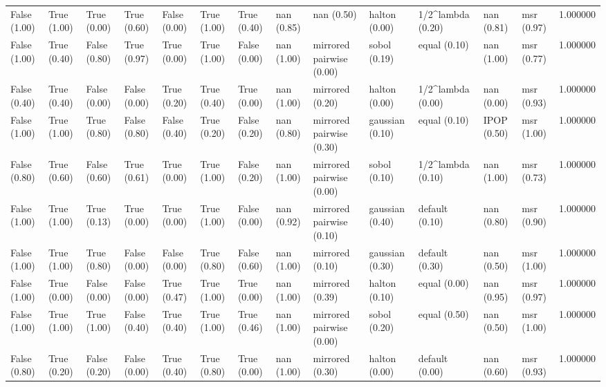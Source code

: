 \begin{tabular}{lllllllllllllr}
False (1.00) & True (1.00) & True (0.00) & True (0.60) & False (0.00) & True (1.00) & True (0.40) & nan (0.85) & nan (0.50) & halton (0.00) & 1/2^lambda (0.20) & nan (0.81) & msr (0.97) & 1.000000 \\
False (1.00) & True (0.40) & False (0.80) & True (0.97) & True (0.00) & True (1.00) & False (0.00) & nan (1.00) & mirrored pairwise (0.00) & sobol (0.19) & equal (0.10) & nan (1.00) & msr (0.77) & 1.000000 \\
False (0.40) & True (0.40) & False (0.00) & False (0.00) & True (0.20) & True (0.40) & True (0.00) & nan (1.00) & mirrored (0.20) & halton (0.00) & 1/2^lambda (0.00) & nan (0.00) & msr (0.93) & 1.000000 \\
False (1.00) & True (1.00) & True (0.80) & False (0.80) & False (0.40) & True (0.20) & False (0.20) & nan (0.80) & mirrored pairwise (0.30) & gaussian (0.10) & equal (0.10) & IPOP (0.50) & msr (1.00) & 1.000000 \\
False (0.80) & True (0.60) & False (0.60) & True (0.61) & True (0.00) & True (1.00) & False (0.20) & nan (1.00) & mirrored pairwise (0.00) & sobol (0.10) & 1/2^lambda (0.10) & nan (1.00) & msr (0.73) & 1.000000 \\
False (1.00) & True (1.00) & True (0.13) & True (0.00) & True (0.00) & True (1.00) & False (0.00) & nan (0.92) & mirrored pairwise (0.10) & gaussian (0.40) & default (0.10) & nan (0.80) & msr (0.90) & 1.000000 \\
False (1.00) & True (1.00) & True (0.80) & False (0.00) & False (0.00) & True (0.80) & False (0.60) & nan (1.00) & mirrored (0.10) & gaussian (0.30) & default (0.30) & nan (0.50) & msr (1.00) & 1.000000 \\
False (1.00) & True (0.00) & False (0.00) & False (0.00) & True (0.47) & True (1.00) & True (0.00) & nan (1.00) & mirrored (0.39) & halton (0.10) & equal (0.00) & nan (0.95) & msr (0.97) & 1.000000 \\
False (1.00) & True (1.00) & True (1.00) & False (0.40) & True (0.40) & True (1.00) & True (0.46) & nan (1.00) & mirrored pairwise (0.00) & sobol (0.20) & equal (0.50) & nan (0.50) & msr (1.00) & 1.000000 \\
False (0.80) & True (0.20) & False (0.20) & False (0.00) & True (0.40) & True (0.80) & True (0.00) & nan (1.00) & mirrored (0.30) & halton (0.00) & default (0.00) & nan (0.60) & msr (0.93) & 1.000000 \\
\bottomrule
\end{tabular}
